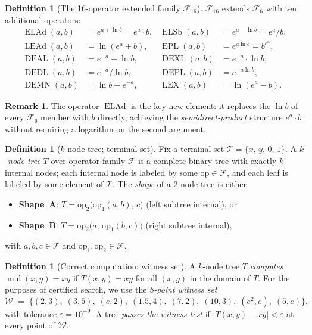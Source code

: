 \documentclass[12pt,a4paper]{article}
\theoremstyle{definition}
\newtheorem{definition}[theorem]{Definition}
\newtheorem{remark}[theorem]{Remark}
\newcommand{\ELAd}{\operatorname{ELAd}}
\newcommand{\ELSb}{\operatorname{ELSb}}
\newcommand{\LEAd}{\operatorname{LEAd}}
\newcommand{\EPL}{\operatorname{EPL}}
\newcommand{\DEAL}{\operatorname{DEAL}}
\newcommand{\DEXL}{\operatorname{DEXL}}
\newcommand{\DEDL}{\operatorname{DEDL}}
\newcommand{\DEPL}{\operatorname{DEPL}}
\newcommand{\DEMN}{\operatorname{DEMN}}
\newcommand{\LEX}{\operatorname{LEX}}
\newcommand{\mul}{\operatorname{mul}}
\begin{document}
\begin{definition}[The 16-operator extended family $\mathcal{F}_{16}$]
\label{def:F16}
$\mathcal{F}_{16}$ extends $\mathcal{F}_6$ with ten additional operators:
\begin{align*}
  \ELAd(a,b)  &= e^{a+\ln b} = e^{a}\cdot b, &
  \ELSb(a,b)  &= e^{a-\ln b} = e^{a}/b, \\
  \LEAd(a,b)  &= \ln(e^{a}+b), &
  \EPL(a,b)   &= e^{a\ln b} = b^{e^{a}}, \\
  \DEAL(a,b)  &= e^{-a}+\ln b, &
  \DEXL(a,b)  &= e^{-a}\cdot\ln b, \\
  \DEDL(a,b)  &= e^{-a}/\ln b, &
  \DEPL(a,b)  &= e^{-a\ln b}, \\
  \DEMN(a,b)  &= \ln b - e^{-a}, &
  \LEX(a,b)   &= \ln(e^{a}-b).
\end{align*}
\end{definition}

\begin{remark}
The operator $\ELAd$ is the key new element: it replaces the $\ln b$ of every
$\mathcal{F}_6$ member with $b$ directly, achieving the \emph{semidirect-product}
structure $e^{a}\cdot b$ without requiring a logarithm on the second argument.
\end{remark}

\begin{definition}[$k$-node tree; terminal set]\label{def:tree}
Fix a terminal set $\mathcal{T} = \{x,\,y,\,0,\,1\}$.
A \emph{$k$-node tree} $T$ over operator family $\mathcal{F}$ is a complete
binary tree with exactly $k$ internal nodes; each internal node is labeled by
some $\mathrm{op}\in\mathcal{F}$, and each leaf is labeled by some element of
$\mathcal{T}$.  The \emph{shape} of a 2-node tree is either
\begin{itemize}
  \item \textbf{Shape~A}: $T = \mathrm{op}_2\!\bigl(\mathrm{op}_1(a,b),\,c\bigr)$
        \quad (left subtree internal), or
  \item \textbf{Shape~B}: $T = \mathrm{op}_2\!\bigl(a,\,\mathrm{op}_1(b,c)\bigr)$
        \quad (right subtree internal),
\end{itemize}
with $a,b,c\in\mathcal{T}$ and $\mathrm{op}_1,\mathrm{op}_2\in\mathcal{F}$.
\end{definition}

\begin{definition}[Correct computation; witness set]\label{def:correct}
A $k$-node tree $T$ \emph{computes} $\mul(x,y)=xy$ if
$T(x,y)=xy$ for all $(x,y)$ in the domain of $T$.
For the purposes of certified search, we use the \emph{8-point witness set}
\[
  \mathcal{W} \;=\;
  \{(2,3),\;(3,5),\;(e,2),\;(1.5,4),\;(7,2),\;(10,3),\;(e^2,e),\;(5,e)\},
\]
with tolerance $\varepsilon=10^{-9}$.  A tree \emph{passes the witness test} if
$|T(x,y)-xy|<\varepsilon$ at every point of $\mathcal{W}$.
\end{definition}
\end{document}
